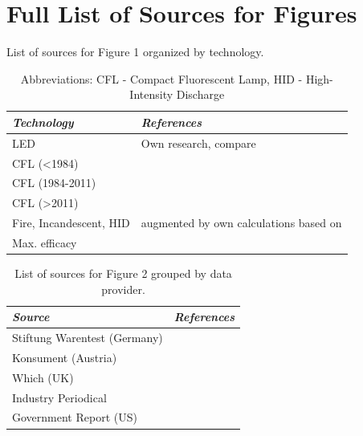 \documentclass[parskip=full]{article}
\begin{document}
\clearpage
\section{Full List of Sources for Figures}
\label{sec:sources}

\begin{table}[h!]
    \caption{List of sources for Figure 1 organized by technology.}
    \begin{NiceTabularX}{\textwidth}{|l|X|}
    \hline
    \textit{Technology} & \textit{References} \\
    \hline
    LED & Own research, compare \cite{zenodo_weinold_led_history} \\
    \hline
    CFL (<1984) & \cite{Bouwknegt1982}\cite{Vrenken1983} \\
    \hline
    CFL (1984-2011) & \cite{eger2018origin} \\
    \hline
    CFL (>2011) & \cite{Guan2015} \\
    \hline
    Fire, Incandescent, HID & \cite{azevedo2009transition} augmented by own calculations based on \cite{benesch1905beleuchtungswesen} \\
    \hline
    Max. efficacy & \cite{Murphy2012} \\
    \hline
    \end{NiceTabularX}
    \vspace{2mm}
    \caption*{Abbreviations: CFL - Compact Fluorescent Lamp, HID - High-Intensity Discharge}
\end{table}

\begin{table}[h!]
    \caption{List of sources for Figure 2 grouped by data provider.}
    \begin{NiceTabularX}{\textwidth}{|l|X|}
    \hline
    \textit{Source} & \textit{References} \\
    \hline
    Stiftung Warentest (Germany) & \cite{Warentest2008}\cite{Warentest2009_1}\cite{Warentest2009_2}\cite{Warentest2010_1}\cite{Warentest2010_2}\cite{Warentest2011}\cite{Warentest2012}\cite{Warentest2013}\cite{Warentest2014_1}\cite{Warentest2014_2}\cite{Warentest2015}\cite{Warentest2016_1}\cite{Warentest2016_2}\cite{Warentest2018} \\
    \hline
    Konsument (Austria) & \cite{Konsument2010} \\
    \hline
    Which (UK) & \cite{Which2020} \\
    \hline
    Industry Periodical & \cite{PM2020} \\
    \hline
    Government Report (US) & \cite{national2013assessment} \\
    \hline
    \end{NiceTabularX}
\end{table}
\end{document}
